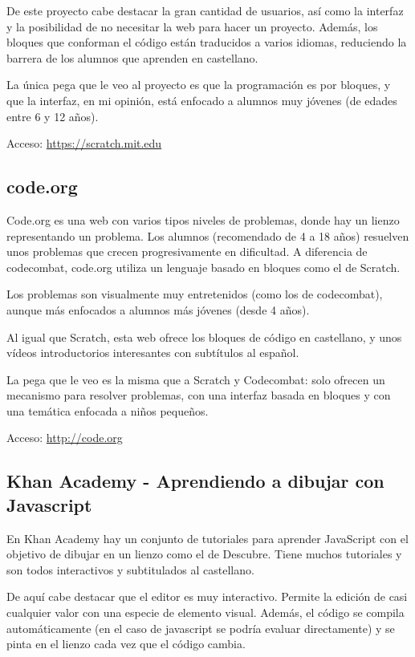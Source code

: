 \documentclass{report}
\begin{document}
	De este proyecto cabe destacar la gran cantidad de usuarios, así como la interfaz y la posibilidad de no necesitar la web para hacer un proyecto. Además, los bloques que conforman el código están traducidos a varios idiomas, reduciendo la barrera de los alumnos que aprenden en castellano.
	
	La única pega que le veo al proyecto es que la programación es por bloques, y que la interfaz, en mi opinión, está enfocado a alumnos muy jóvenes (de edades entre 6 y 12 años). 
	
	\hfill
	
	Acceso: \url{https://scratch.mit.edu}
	
	\subsection{code.org}
	
	Code.org es una web con varios tipos niveles de problemas, donde hay un lienzo representando un problema. Los alumnos (recomendado de 4 a 18 años) resuelven unos problemas que crecen progresivamente en dificultad. A diferencia de codecombat, code.org utiliza un lenguaje basado en bloques como el de Scratch. 
	
	Los problemas son visualmente muy entretenidos (como los de codecombat), aunque más enfocados a alumnos más jóvenes (desde 4 años).
	
	Al igual que Scratch, esta web ofrece los bloques de código en castellano, y unos vídeos introductorios interesantes con subtítulos al español.
	
	La pega que le veo es la misma que a Scratch y Codecombat: solo ofrecen un mecanismo para resolver problemas, con una interfaz basada en bloques y con una temática enfocada a niños pequeños.
	
	\hfill
	
	Acceso: \url{http://code.org}
	
	\subsection{Khan Academy - Aprendiendo a dibujar con Javascript}
	
	En Khan Academy hay un conjunto de tutoriales para aprender JavaScript con el objetivo de dibujar en un lienzo como el de Descubre. Tiene muchos tutoriales y son todos interactivos y subtitulados al castellano.
	
	\hfill
	
	De aquí cabe destacar que el editor es muy interactivo. Permite la edición de casi cualquier valor con una especie de elemento visual. Además, el código se compila automáticamente (en el caso de javascript se podría evaluar directamente) y se pinta en el lienzo cada vez que el código cambia. 
	
\end{document}
